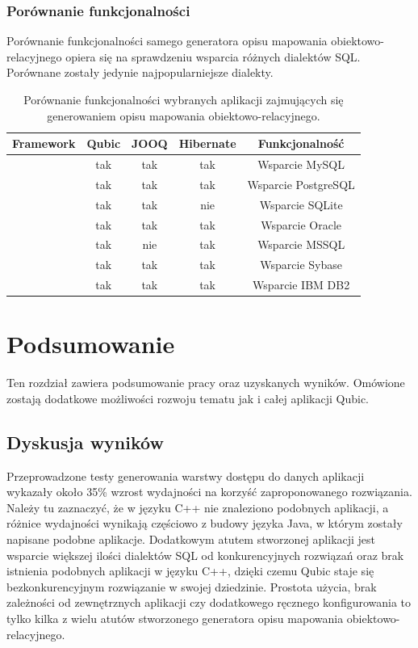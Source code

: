 \documentclass[12pt]{report}
\begin{document}
\subsection{Porównanie funkcjonalności}  

Porównanie funkcjonalności samego generatora opisu mapowania obiektowo-relacyjnego opiera się na sprawdzeniu wsparcia różnych dialektów SQL. Porównane zostały jedynie najpopularniejsze dialekty.
\begin{table}[!ht]
\centering
    \begin{tabular}{ccccc}
    \hline
    Framework & Qubic & JOOQ & Hibernate & Funkcjonalność \\ \hline
    & tak & tak & tak & Wsparcie MySQL \\ \hline
& tak & tak & tak & Wsparcie PostgreSQL \\ \hline
& tak & tak & nie & Wsparcie SQLite \\ \hline
& tak & tak & tak & Wsparcie Oracle \\ \hline
& tak & nie & tak & Wsparcie MSSQL \\ \hline
& tak & tak & tak & Wsparcie Sybase \\ \hline
& tak & tak & tak & Wsparcie IBM DB2 \\ \hline
    \end{tabular}
    \caption{Porównanie funkcjonalności wybranych aplikacji zajmujących się generowaniem opisu mapowania obiektowo-relacyjnego.}
\end{table}

\chapter{Podsumowanie}
Ten rozdział zawiera podsumowanie pracy oraz uzyskanych wyników. Omówione zostają dodatkowe możliwości rozwoju tematu jak i całej aplikacji Qubic.
\section{Dyskusja wyników}
Przeprowadzone testy generowania warstwy dostępu do danych aplikacji wykazały około 35\% wzrost wydajności na korzyść zaproponowanego rozwiązania. Należy tu zaznaczyć, że w języku C++ nie znaleziono podobnych aplikacji, a różnice wydajności wynikają częściowo z budowy języka Java, w którym zostały napisane podobne aplikacje. Dodatkowym atutem stworzonej aplikacji jest wsparcie większej ilości dialektów SQL od konkurencyjnych rozwiązań oraz brak istnienia podobnych aplikacji w języku C++, dzięki czemu Qubic staje się bezkonkurencyjnym rozwiązanie w swojej dziedzinie. Prostota użycia, brak zależności od zewnętrznych aplikacji czy dodatkowego ręcznego konfigurowania to tylko kilka z wielu atutów stworzonego generatora opisu mapowania obiektowo-relacyjnego.
\end{document}
